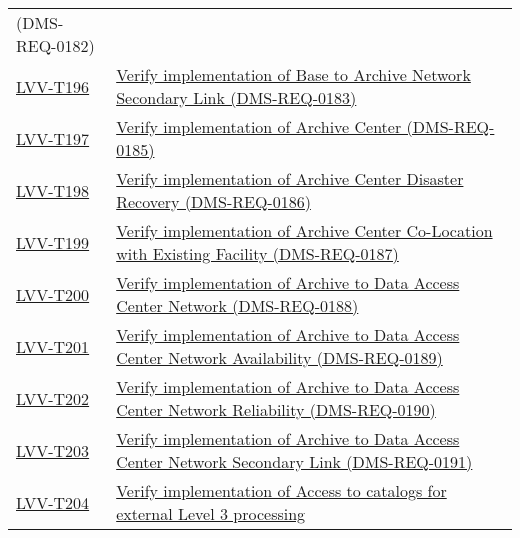 \begin{longtable}[]{@{}ll@{}}
{(DMS-REQ-0182)}\tabularnewline
\protect\hyperlink{lvv-t196---verify-implementation-of-base-to-archive-network-secondary-link-dms-req-0183}{LVV-T196}
&
\href{https://jira.lsstcorp.org/secure/Tests.jspa\#/testCase/LVV-T196}{Verify
implementation of Base to Archive Network Secondary Link
(DMS-REQ-0183)}\tabularnewline
\protect\hyperlink{lvv-t197---verify-implementation-of-archive-center-dms-req-0185}{LVV-T197}
&
\href{https://jira.lsstcorp.org/secure/Tests.jspa\#/testCase/LVV-T197}{Verify
implementation of Archive Center (DMS-REQ-0185)}\tabularnewline
\protect\hyperlink{lvv-t198---verify-implementation-of--archive-center-disaster-recovery-dms-req-0186}{LVV-T198}
&
\href{https://jira.lsstcorp.org/secure/Tests.jspa\#/testCase/LVV-T198}{Verify
implementation of Archive Center Disaster Recovery
(DMS-REQ-0186)}\tabularnewline
\protect\hyperlink{lvv-t199---verify-implementation-of-archive-center-co-location-with-existing-facility-dms-req-0187}{LVV-T199}
&
\href{https://jira.lsstcorp.org/secure/Tests.jspa\#/testCase/LVV-T199}{Verify
implementation of Archive Center Co-Location with Existing Facility
(DMS-REQ-0187)}\tabularnewline
\protect\hyperlink{lvv-t200---verify-implementation-of-archive-to-data-access-center-network-dms-req-0188}{LVV-T200}
&
\href{https://jira.lsstcorp.org/secure/Tests.jspa\#/testCase/LVV-T200}{Verify
implementation of Archive to Data Access Center Network
(DMS-REQ-0188)}\tabularnewline
\protect\hyperlink{lvv-t201---verify-implementation-of-archive-to-data-access-center-network-availability-dms-req-0189}{LVV-T201}
&
\href{https://jira.lsstcorp.org/secure/Tests.jspa\#/testCase/LVV-T201}{Verify
implementation of Archive to Data Access Center Network Availability
(DMS-REQ-0189)}\tabularnewline
\protect\hyperlink{lvv-t202---verify-implementation-of-archive-to-data-access-center-network-reliability-dms-req-0190}{LVV-T202}
&
\href{https://jira.lsstcorp.org/secure/Tests.jspa\#/testCase/LVV-T202}{Verify
implementation of Archive to Data Access Center Network Reliability
(DMS-REQ-0190)}\tabularnewline
\protect\hyperlink{lvv-t203---verify-implementation-of-archive-to-data-access-center-network-secondary-link-dms-req-0191}{LVV-T203}
&
\href{https://jira.lsstcorp.org/secure/Tests.jspa\#/testCase/LVV-T203}{Verify
implementation of Archive to Data Access Center Network Secondary Link
(DMS-REQ-0191)}\tabularnewline
\protect\hyperlink{lvv-t204---verify-implementation-of-access-to-catalogs-for-external-level-3-processing-dms-req-0122}{LVV-T204}
&
\href{https://jira.lsstcorp.org/secure/Tests.jspa\#/testCase/LVV-T204}{Verify
implementation of Access to catalogs for external Level 3 processing
}
\end{longtable}

